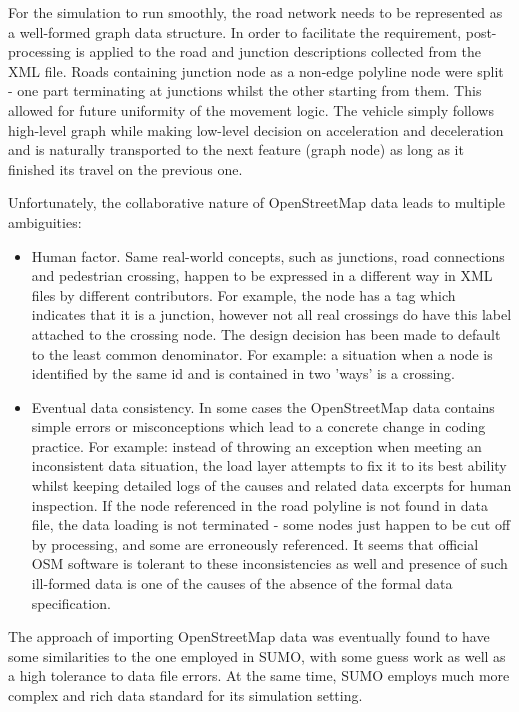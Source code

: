 For the simulation to run smoothly, the road network needs to be represented as a well-formed graph data structure. In order to facilitate the requirement, post-processing is applied to the road and junction descriptions collected from the XML file. Roads containing junction node as a non-edge polyline node were split - one part terminating at junctions whilst the other starting from them. This allowed for future uniformity of the movement logic. The vehicle simply follows high-level graph while making low-level decision on acceleration and deceleration and is naturally transported to the next feature (graph node) as long as it finished its travel on the previous one.

Unfortunately, the collaborative nature of OpenStreetMap data leads to multiple ambiguities:
\begin{itemize}
    \item Human factor. Same real-world concepts, such as junctions, road connections and pedestrian crossing, happen to be expressed in a different way in XML files by different contributors. For example, the node has a tag which indicates that it is a junction, however not all real crossings do have this label attached to the crossing node. The design decision has been made to default to the least common denominator. For example: a situation when a node is identified by the same id and is contained in two 'ways' is a crossing.
    \item Eventual data consistency. In some cases the OpenStreetMap data contains simple errors or misconceptions which lead to a concrete change in coding practice. For example: instead of throwing an exception when meeting an inconsistent data situation, the load layer attempts to fix it to its best ability whilst keeping detailed logs of the causes and related data excerpts for human inspection. If the node referenced in the road polyline is not found in data file, the data loading is not terminated - some nodes just happen to be cut off by processing, and some are erroneously referenced. It seems that official OSM software is tolerant to these inconsistencies as well and presence of such ill-formed data is one of the causes of the absence of the formal data specification.
\end{itemize}

The approach of importing OpenStreetMap data was eventually found to have some similarities to the one employed in SUMO, with some guess work as well as a high tolerance to data file errors. At the same time, SUMO employs much more complex and rich data standard for its simulation setting.

